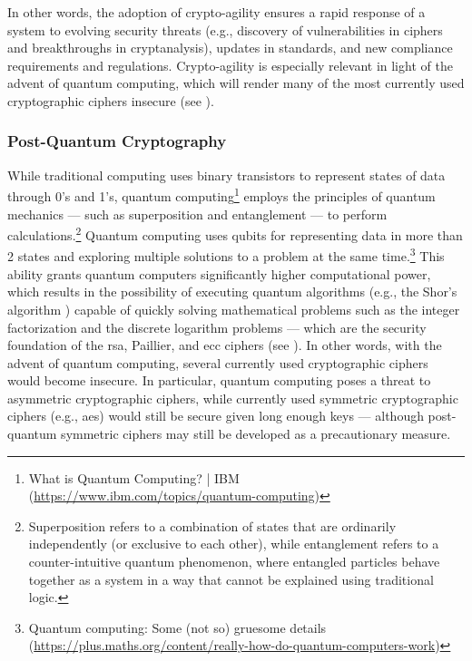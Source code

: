 In other words, the adoption of crypto-agility ensures a rapid response of a system to evolving security threats (e.g., discovery of vulnerabilities in ciphers and breakthroughs in cryptanalysis), updates in standards, and new compliance requirements and regulations. Crypto-agility is especially relevant in light of the advent of quantum computing, which will render many of the most currently used cryptographic ciphers insecure (see ).



\subsubsection{Post-Quantum Cryptography}\label{sec:further:key_management:pq}

While traditional computing uses binary transistors to represent states of data through 0's and 1's, quantum computing\footnote{What is Quantum Computing? | IBM (\url{https://www.ibm.com/topics/quantum-computing})} employs the principles of quantum mechanics --- such as superposition and entanglement --- to perform calculations.\footnote{Superposition refers to a combination of states that are ordinarily independently (or exclusive to each other), while entanglement refers to a counter-intuitive quantum phenomenon, where entangled particles behave together as a system in a way that cannot be explained using traditional logic.} Quantum computing uses qubits for representing data in more than 2 states and exploring multiple solutions to a problem at the same time.\footnote{Quantum computing: Some (not so) gruesome details (\url{https://plus.maths.org/content/really-how-do-quantum-computers-work})} This ability grants quantum computers significantly higher computational power, which results in the possibility of executing quantum algorithms (e.g., the Shor's algorithm \cite{shor_algorithms_1994}) capable of quickly solving mathematical problems such as the integer factorization and the discrete logarithm problems --- which are the security foundation of the \gls{rsa}, Paillier, and \gls{ecc} ciphers (see ). In other words, with the advent of quantum computing, several currently used cryptographic ciphers would become insecure. In particular, quantum computing poses a threat to asymmetric cryptographic ciphers, while currently used symmetric cryptographic ciphers (e.g., \gls{aes}) would still be secure given long enough keys --- although post-quantum symmetric ciphers may still be developed as a precautionary measure.


